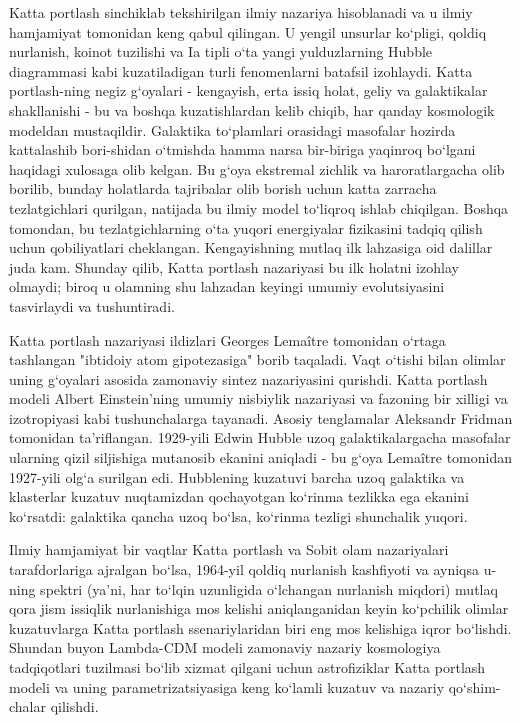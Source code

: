 \documentclass[14pt]{scrartcl}
\begin{document}
Katta portlash sinchiklab tekshirilgan ilmiy nazariya hisoblanadi va u ilmiy hamjamiyat tomonidan keng qabul qilingan. U yengil unsurlar ko`pligi, qoldiq nurlanish, koinot tuzilishi va Ia tipli o`ta yangi yulduzlarning Hubble diagrammasi kabi kuzatiladigan turli fenomenlarni batafsil izohlaydi. Katta portlash-ning negiz g`oyalari - kengayish, erta issiq holat, geliy va galaktikalar shakllanishi - bu va boshqa kuzatishlardan kelib chiqib, har qanday kosmologik modeldan mustaqildir. Galaktika to`plamlari orasidagi masofalar hozirda kattalashib bori-shidan o`tmishda hamma narsa bir-biriga yaqinroq bo`lgani haqidagi xulosaga olib kelgan. Bu g`oya ekstremal zichlik va haroratlargacha olib borilib, bunday holatlarda tajribalar olib borish uchun katta zarracha tezlatgichlari qurilgan, natijada bu ilmiy model to`liqroq ishlab chiqilgan. Boshqa tomondan, bu tezlatgichlarning o`ta yuqori energiyalar fizikasini tadqiq qilish uchun qobiliyatlari cheklangan. Kengayishning mutlaq ilk lahzasiga oid dalillar juda kam. Shunday qilib, Katta portlash nazariyasi bu ilk holatni izohlay olmaydi; biroq u olamning shu lahzadan keyingi umumiy evolutsiyasini tasvirlaydi va tushuntiradi.

Katta portlash nazariyasi ildizlari Georges Lema\^{i}tre tomonidan o`rtaga tashlangan "ibtidoiy atom gipotezasiga" borib taqaladi. Vaqt o`tishi bilan olimlar uning g`oyalari asosida zamonaviy sintez nazariyasini qurishdi. Katta portlash modeli Albert Einstein'ning umumiy nisbiylik nazariyasi va fazoning bir xilligi va izotropiyasi kabi tushunchalarga tayanadi. Asosiy tenglamalar Aleksandr Fridman tomonidan ta'riflangan. 1929-yili Edwin Hubble uzoq galaktikalargacha masofalar ularning qizil siljishiga mutanosib ekanini aniqladi - bu g`oya Lema\^{i}tre tomonidan 1927-yili olg`a surilgan edi. Hubblening kuzatuvi barcha uzoq galaktika va klasterlar kuzatuv nuqtamizdan qochayotgan ko`rinma tezlikka ega ekanini ko`rsatdi: galaktika qancha uzoq bo`lsa, ko`rinma tezligi shunchalik yuqori.

Ilmiy hamjamiyat bir vaqtlar Katta portlash va Sobit olam nazariyalari tarafdorlariga ajralgan bo`lsa, 1964-yil qoldiq nurlanish kashfiyoti va ayniqsa u-ning spektri (ya'ni, har to`lqin uzunligida o`lchangan nurlanish miqdori) mutlaq qora jism issiqlik nurlanishiga mos kelishi aniqlanganidan keyin ko`pchilik olimlar kuzatuvlarga Katta portlash ssenariylaridan biri eng mos kelishiga iqror bo`lishdi. Shundan buyon Lambda-CDM modeli zamonaviy nazariy kosmologiya tadqiqotlari tuzilmasi bo`lib xizmat qilgani uchun astrofiziklar Katta portlash modeli va uning parametrizatsiyasiga keng ko`lamli kuzatuv va nazariy qo`shim-chalar qilishdi. 
\newpage
\end{document}
